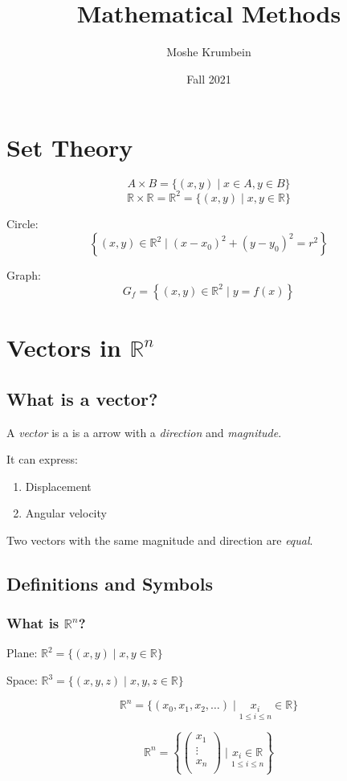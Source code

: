 \documentclass[00_complete]{subfiles}
\title{Mathematical Methods}
\author{Moshe Krumbein}
\date{Fall 2021}
\begin{document}

\section{Set Theory}

$$A \times B = \{(x,y) \;|\; x \in A, y \in B\}$$
$$\mathbb{R} \times \mathbb{R} = \mathbb{R}^2 = \{(x,y)\;|\;x,y \in \mathbb{R}\}$$

Circle:
$$\left\{(x,y) \in \mathbb{R}^2 \;|\; (x-x_0)^2 + (y-y_0)^2 = r^2\right\}$$

Graph:
$$G_f = \left\{(x,y) \in \mathbb{R}^2 \;|\; y=f(x)\right\}$$

\section{Vectors in \texorpdfstring{$\mathbb{R}^n$}{Rn}}

\subsection{What is a vector?}

A \emph{vector} is a is a arrow with a \emph{direction} and \emph{magnitude}.

It can express:
\begin{enumerate}
    \item Displacement
    \item Angular velocity
\end{enumerate}

Two vectors with the same magnitude and direction are \emph{equal}.
\subsection{Definitions and Symbols}

\subsubsection{What is \texorpdfstring{$\mathbb{R}^n$}{Rn}?}

Plane: $\mathbb{R}^2=\{(x,y)\;|\;x,y \in \mathbb{R}\}$

Space: $\mathbb{R}^3=\{(x,y,z)\;|\;x,y,z \in \mathbb{R}\}$

$$\mathbb{R}^n = \{(x_0,x_1,x_2,\dots)\;|\;\underset{1 \leq i \leq n}{x_i} \in \mathbb{R}\}$$

$$\mathbb{R}^n=\left\{
\begin{pmatrix}
   x_1 \\
   \vdots \\
   x_n \\
\end{pmatrix} \;|\;
\underset{1 \leq i \leq n}{x_i \in \mathbb{R}}
\right\}$$
\end{document}
